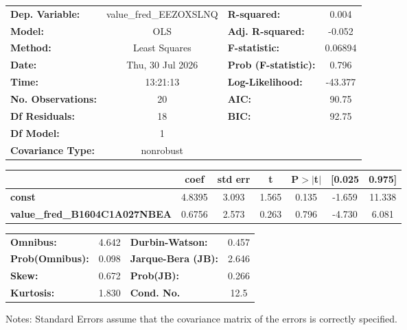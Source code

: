 \begin{center}
\begin{tabular}{lclc}
\toprule
\textbf{Dep. Variable:}               & value\_fred\_EEZOXSLNQ & \textbf{  R-squared:         } &     0.004   \\
\textbf{Model:}                       &          OLS           & \textbf{  Adj. R-squared:    } &    -0.052   \\
\textbf{Method:}                      &     Least Squares      & \textbf{  F-statistic:       } &   0.06894   \\
\textbf{Date:}                        &    Thu, 30 Jul 2026    & \textbf{  Prob (F-statistic):} &    0.796    \\
\textbf{Time:}                        &        13:21:13        & \textbf{  Log-Likelihood:    } &   -43.377   \\
\textbf{No. Observations:}            &             20         & \textbf{  AIC:               } &     90.75   \\
\textbf{Df Residuals:}                &             18         & \textbf{  BIC:               } &     92.75   \\
\textbf{Df Model:}                    &              1         & \textbf{                     } &             \\
\textbf{Covariance Type:}             &       nonrobust        & \textbf{                     } &             \\
\bottomrule
\end{tabular}
\begin{tabular}{lcccccc}
                                      & \textbf{coef} & \textbf{std err} & \textbf{t} & \textbf{P$> |$t$|$} & \textbf{[0.025} & \textbf{0.975]}  \\
\midrule
\textbf{const}                        &       4.8395  &        3.093     &     1.565  &         0.135        &       -1.659    &       11.338     \\
\textbf{value\_fred\_B1604C1A027NBEA} &       0.6756  &        2.573     &     0.263  &         0.796        &       -4.730    &        6.081     \\
\bottomrule
\end{tabular}
\begin{tabular}{lclc}
\textbf{Omnibus:}       &  4.642 & \textbf{  Durbin-Watson:     } &    0.457  \\
\textbf{Prob(Omnibus):} &  0.098 & \textbf{  Jarque-Bera (JB):  } &    2.646  \\
\textbf{Skew:}          &  0.672 & \textbf{  Prob(JB):          } &    0.266  \\
\textbf{Kurtosis:}      &  1.830 & \textbf{  Cond. No.          } &     12.5  \\
\bottomrule
\end{tabular}
\end{center}

Notes: \newline
 [1] Standard Errors assume that the covariance matrix of the errors is correctly specified.